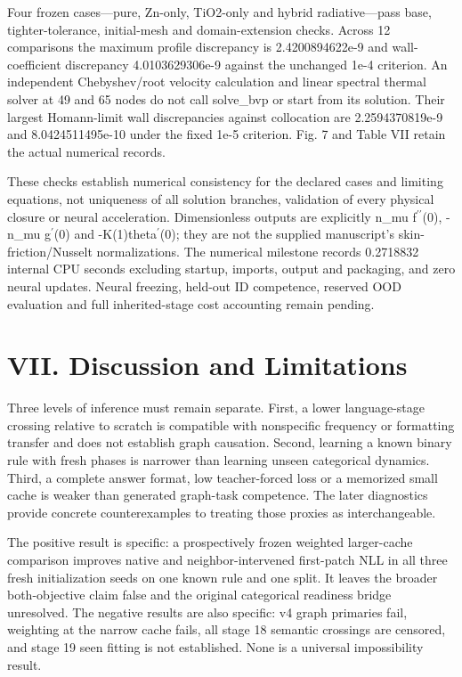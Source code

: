 \documentclass[10pt,letterpaper,twocolumn]{article}
\begin{document}
Four frozen cases---pure, Zn-only, TiO2-only and hybrid radiative---pass base, tighter-tolerance, initial-mesh and domain-extension checks. Across 12 comparisons the maximum profile discrepancy is 2.4200894622e-9 and wall-coefficient discrepancy 4.0103629306e-9 against the unchanged 1e-4 criterion. An independent Chebyshev/\allowbreak{}root velocity calculation and linear spectral thermal solver at 49 and 65 nodes do not call solve\_\allowbreak{}bvp or start from its solution. Their largest Homann-limit wall discrepancies against collocation are 2.2594370819e-9 and 8.0424511495e-10 under the fixed 1e-5 criterion. Fig. 7 and Table VII retain the actual numerical records.

These checks establish numerical consistency for the declared cases and limiting equations, not uniqueness of all solution branches, validation of every physical closure or neural acceleration. Dimensionless outputs are explicitly n\_\allowbreak{}mu f\ensuremath{^{\prime\prime}}(0), -n\_\allowbreak{}mu g\ensuremath{^{\prime}}(0) and -K(1)theta\ensuremath{^{\prime}}(0); they are not the supplied manuscript's skin-friction/\allowbreak{}Nusselt normalizations. The numerical milestone records 0.2718832 internal CPU seconds excluding startup, imports, output and packaging, and zero neural updates. Neural freezing, held-out ID competence, reserved OOD evaluation and full inherited-stage cost accounting remain pending.

\section*{VII. Discussion and Limitations}
Three levels of inference must remain separate. First, a lower language-stage crossing relative to scratch is compatible with nonspecific frequency or formatting transfer and does not establish graph causation. Second, learning a known binary rule with fresh phases is narrower than learning unseen categorical dynamics. Third, a complete answer format, low teacher-forced loss or a memorized small cache is weaker than generated graph-task competence. The later diagnostics provide concrete counterexamples to treating those proxies as interchangeable.

The positive result is specific: a prospectively frozen weighted larger-cache comparison improves native and neighbor-intervened first-patch NLL in all three fresh initialization seeds on one known rule and one split. It leaves the broader both-objective claim false and the original categorical readiness bridge unresolved. The negative results are also specific: v4 graph primaries fail, weighting at the narrow cache fails, all stage 18 semantic crossings are censored, and stage 19 seen fitting is not established. None is a universal impossibility result.
\end{document}
